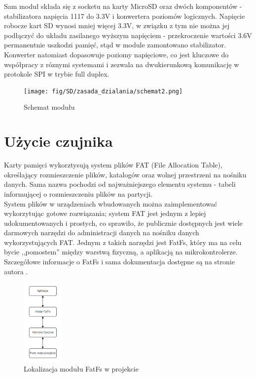 \documentclass[11pt, a4paper]{article}
\begin{document}
Sam moduł składa się z socketu na karty MicroSD oraz dwóch komponentów - stabilizatora napięcia 1117 do 3.3V i konwertera poziomów logicznych. Napięcie robocze kart SD wynosi mniej więcej 3.3V, w związku z tym nie można jej podłączyć do układu zasilanego wyższym napięciem - przekroczenie wartości 3.6V permanentnie uszkodzi pamięć, stąd w module zamontowano stabilizator. Konwerter natomiast dopasowuje poziomy napięciowe, co jest kluczowe do współpracy z róznymi systemami i zezwala na dwukierunkową komunikację w protokole SPI w trybie full duplex.

\begin{figure}[h!]
\centering
\texttt{[image: fig/SD/zasada\_dzialania/schemat2.png]}
\caption{Schemat modułu}
\label{fig:sub2}
\end{figure}

\newpage
\section*{Użycie czujnika}
Karty pamięci wykorztysują system plików FAT (File Allocation Table), określający rozmieszczenie plików, katalogów oraz wolnej przestrzeni na nośniku danych. Sama nazwa pochodzi od najważniejszego elementu systemu - tabeli informującej o rozmieszczeniu plików na partycji. \\
System plików w urządzeniach wbudowanych można zaimplementować wykorzytując gotowe rozwiązania; system FAT jest jednym z lepiej udokumentowanych i prostych, co sprawiło, że publicznie dostępnych jest wiele darmowych narzędzi do administracji danych na nośniku danych wykorzystujących FAT. Jednym z takich narzędzi jest FatFs, który ma na celu bycie ,,pomostem''  między warstwą fizyczną, a aplikacją na mikrokontrolerze. Szczegółowe informacje o FatFs i sama dokumentacja dostępne są na stronie autora \cite{SD:FatFs}.

\vspace{0.5cm}
\begin{figure}[h!]
    \centering
    \includegraphics[width=0.18\textwidth]{fig/SD/działanie_ukladu/fatfs.png}
    \caption{Lokalizacja modułu FatFs w projekcie}
    \label{fig:my_label}
\end{figure}
\end{document}

